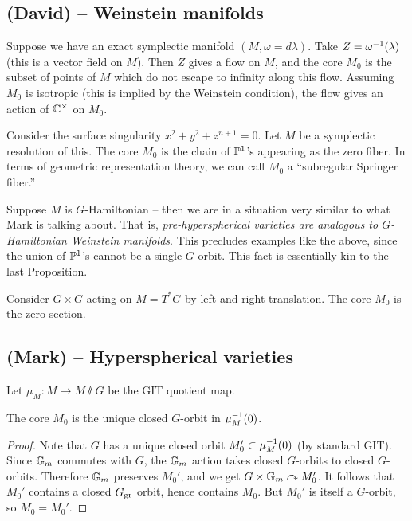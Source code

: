 \documentclass{article}
\begin{document}
\subsection{(David) -- Weinstein manifolds}

Suppose we have an exact symplectic manifold $(M, \omega = d\lambda)$.
Take $Z = \omega^{-1}(\lambda)$ (this is a vector field on $M$).
Then $Z$ gives a flow on $M$, and the core $M_0$ is the subset of points of $M$ which do not escape to infinity along this flow.
Assuming $M_0$ is isotropic (this is implied by the Weinstein condition), the flow gives an action of $\mathbb{C}^\times$ on $M_0$.

\begin{ex}
	Consider the surface singularity $x^2 + y^2 + z^{n+1} = 0$.
	Let $M$ be a symplectic resolution of this.
	The core $M_0$ is the chain of $\mathbb{P}^1$'s appearing as the zero fiber.
	In terms of geometric representation theory, we can call $M_0$ a ``subregular Springer fiber.''
\end{ex}

Suppose $M$ is $G$-Hamiltonian -- then we are in a situation very similar to what Mark is talking about.
That is, \emph{pre-hyperspherical varieties are analogous to $G$-Hamiltonian Weinstein manifolds}.
This precludes examples like the above, since the union of $\mathbb{P}^1$'s cannot be a single $G$-orbit.
This fact is essentially kin to the last Proposition.

\begin{ex}
	Consider $G \times G$ acting on $M = T^* G$ by left and right translation.
	The core $M_0$ is the zero section.
\end{ex}

\subsection{(Mark) -- Hyperspherical varieties}

Let $\mu_M: M \to M \sslash G$ be the GIT quotient map.

\begin{prop}
	The core $M_0$ is the unique closed $G$-orbit in $\mu_M^{-1}(0)$.
\end{prop}

\begin{proof}
	Note that $G$ has a unique closed orbit $M_0' \subset \mu_M^{-1}(0)$ (by standard GIT).
	Since $\mathbb{G}_m$ commutes with $G$, the $\mathbb{G}_m$ action takes closed $G$-orbits to closed $G$-orbits.
	Therefore $\mathbb{G}_m$ preserves $M_0'$, and we get $G \times \mathbb{G}_m \curvearrowright M_0'$.
	It follows that $M_0'$ contains a closed $G_{\operatorname{gr}}$ orbit, hence contains $M_0$.
	But $M_0'$ is itself a $G$-orbit, so $M_0 = M_0'$.
\end{proof}
\end{document}
